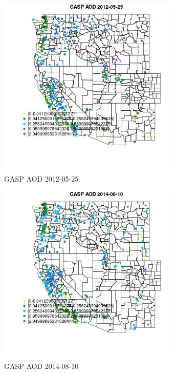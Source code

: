 \begin{figure} 
\centering  
\includegraphics[width=0.77\textwidth]{Code_Outputs/Report_ML_input_PM25_Step4_part_e_de_duplicated_aves_compiled_2019-05-18wNAs_MapObsGASP_AOD2012-05-25.jpg} 
\caption{\label{fig:Report_ML_input_PM25_Step4_part_e_de_duplicated_aves_compiled_2019-05-18wNAsMapObsGASP_AOD2012-05-25}GASP AOD 2012-05-25} 
\end{figure} 
 

\clearpage 

\begin{figure} 
\centering  
\includegraphics[width=0.77\textwidth]{Code_Outputs/Report_ML_input_PM25_Step4_part_e_de_duplicated_aves_compiled_2019-05-18wNAs_MapObsGASP_AOD2014-08-10.jpg} 
\caption{\label{fig:Report_ML_input_PM25_Step4_part_e_de_duplicated_aves_compiled_2019-05-18wNAsMapObsGASP_AOD2014-08-10}GASP AOD 2014-08-10} 
\end{figure} 
 

